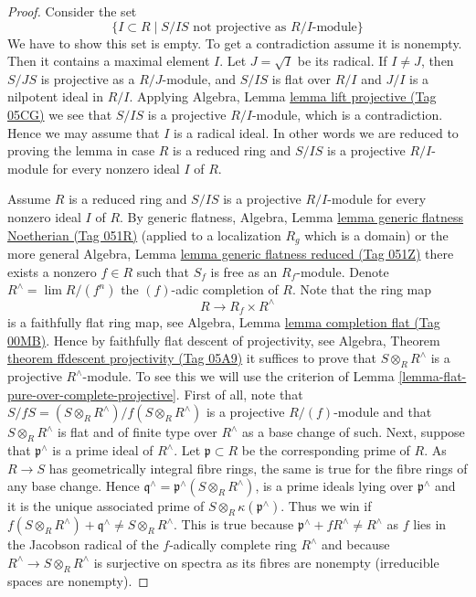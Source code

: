 \documentclass{amsart}
\theoremstyle{plain}
\theoremstyle{definition}
\theoremstyle{remark}
\numberwithin{equation}{subsection}
\def\lim{\mathop{\mathrm{lim}}\nolimits}
\begin{document}
\begin{proof}
Consider the set
$$
\{I \subset R \mid S/IS\text{ not projective as }R/I\text{-module}\}
$$
We have to show this set is empty. To get a contradiction assume it is
nonempty. Then it contains a maximal element $I$.
Let $J = \sqrt{I}$ be its radical. If $I \not = J$, then
$S/JS$ is projective as a $R/J$-module, and $S/IS$ is flat over $R/I$
and $J/I$ is a nilpotent ideal in $R/I$. Applying
Algebra, Lemma \href{https://stacks.math.columbia.edu/tag/05CG}{lemma lift projective (Tag 05CG)}
we see that $S/IS$ is a projective $R/I$-module, which is a contradiction.
Hence we may assume that $I$ is a radical ideal. In other words we
are reduced to proving the lemma in case $R$ is a reduced ring and
$S/IS$ is a projective $R/I$-module for every nonzero ideal $I$
of $R$.

\medskip\noindent
Assume $R$ is a reduced ring and $S/IS$ is a projective $R/I$-module
for every nonzero ideal $I$ of $R$. By generic flatness,
Algebra, Lemma \href{https://stacks.math.columbia.edu/tag/051R}{lemma generic flatness Noetherian (Tag 051R)}
(applied to a localization $R_g$ which is a domain) or the more general
Algebra, Lemma \href{https://stacks.math.columbia.edu/tag/051Z}{lemma generic flatness reduced (Tag 051Z)}
there exists a nonzero $f \in R$ such that $S_f$ is free as an
$R_f$-module. Denote $R^\wedge = \lim R/(f^n)$ the $(f)$-adic completion
of $R$. Note that the ring map
$$
R \longrightarrow R_f \times R^\wedge
$$
is a faithfully flat ring map, see
Algebra, Lemma \href{https://stacks.math.columbia.edu/tag/00MB}{lemma completion flat (Tag 00MB)}.
Hence by faithfully flat descent of projectivity, see
Algebra, Theorem \href{https://stacks.math.columbia.edu/tag/05A9}{theorem ffdescent projectivity (Tag 05A9)}
it suffices to prove that $S \otimes_R R^\wedge$ is a projective
$R^\wedge$-module. To see this we will use the criterion of
Lemma \ref{lemma-flat-pure-over-complete-projective}.
First of all, note that $S/fS = (S \otimes_R R^\wedge)/f(S \otimes_R R^\wedge)$
is a projective $R/(f)$-module and that $S \otimes_R R^\wedge$ is flat
and of finite type over $R^\wedge$ as a base change of such.
Next, suppose that $\mathfrak p^\wedge$ is a prime ideal
of $R^\wedge$. Let $\mathfrak p \subset R$ be the corresponding prime
of $R$. As $R \to S$ has geometrically integral fibre rings, the
same is true for the fibre rings of any base change. Hence
$\mathfrak q^\wedge = \mathfrak p^\wedge(S \otimes_R R^\wedge)$,
is a prime ideals lying over $\mathfrak p^\wedge$
and it is the unique associated prime of
$S \otimes_R \kappa(\mathfrak p^\wedge)$. Thus we win if
$f(S \otimes_R R^\wedge) + \mathfrak q^\wedge \not = S \otimes_R R^\wedge$.
This is true because $\mathfrak p^\wedge + fR^\wedge \not = R^\wedge$ as
$f$ lies in the Jacobson radical of the $f$-adically complete ring $R^\wedge$
and because $R^\wedge \to S \otimes_R R^\wedge$ is surjective on spectra
as its fibres are nonempty (irreducible spaces are nonempty).
\end{proof}
\end{document}
